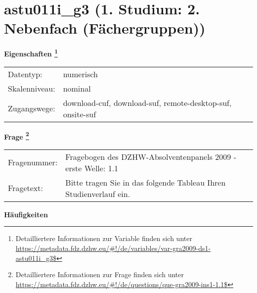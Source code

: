 
    \setcounter{footnote}{0}

    \vspace*{-1.8cm}
	\section{astu011i\_g3 (1. Studium: 2. Nebenfach (Fächergruppen))}
	\label{section:astu011i_g3}



    \vspace*{0.5cm}
    \noindent\textbf{Eigenschaften
	\footnote{Detailliertere Informationen zur Variable finden sich unter
		\url{https://metadata.fdz.dzhw.eu/\#!/de/variables/var-gra2009-ds1-astu011i_g3$}}}\\
	\begin{tabularx}{\hsize}{@{}lX}
	Datentyp: & numerisch \\
	Skalenniveau: & nominal \\
	Zugangswege: &
	  download-cuf, 
	  download-suf, 
	  remote-desktop-suf, 
	  onsite-suf
 \\
    \end{tabularx}



				\vspace*{0.5cm}
                \noindent\textbf{Frage
	                \footnote{Detailliertere Informationen zur Frage finden sich unter
		              \url{https://metadata.fdz.dzhw.eu/\#!/de/questions/que-gra2009-ins1-1.1$}}}\\
				\begin{tabularx}{\hsize}{@{}lX}
					Fragenummer: &
					  Fragebogen des DZHW-Absolventenpanels 2009 - erste Welle:
					  1.1
 \\
					Fragetext: & Bitte tragen Sie in das folgende Tableau Ihren Studienverlauf ein. \\
				\end{tabularx}





        		\vspace*{0.5cm}
                \noindent\textbf{Häufigkeiten}

